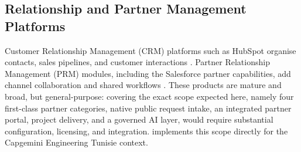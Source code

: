 \subsection{Relationship and Partner Management Platforms}
Customer Relationship Management (CRM) platforms such as HubSpot organise contacts, sales pipelines, and customer interactions . Partner Relationship Management (PRM) modules, including the Salesforce partner capabilities, add channel collaboration and shared workflows . These products are mature and broad, but general-purpose: covering the exact scope expected here, namely four first-class partner categories, native public request intake, an integrated partner portal, project delivery, and a governed AI layer, would require substantial configuration, licensing, and integration. \projectname{} implements this scope directly for the Capgemini Engineering Tunisie context.
